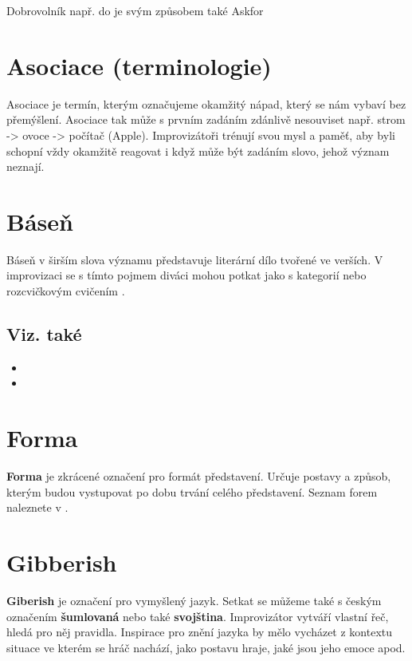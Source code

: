 \documentclass[main.tex]{subfiles}
\begin{document}
Dobrovolník např. do  je svým způsobem také Askfor 
 
 
\needspace{5cm} \section{Asociace (terminologie)} \label{asociace (terminologie)} Asociace je termín, kterým označujeme okamžitý nápad, který se nám vybaví bez přemýšlení. Asociace tak může s prvním zadáním zdánlivě nesouviset např. strom -> ovoce -> počítač (Apple). Improvizátoři trénují svou mysl a paměť, aby byli schopní vždy okamžitě reagovat i když může být zadáním slovo, jehož význam neznají. 
 
 
\needspace{5cm} \section{Báseň} \label{báseň} Báseň v širším slova významu představuje literární dílo tvořené ve verších. 
V improvizaci se s tímto pojmem diváci mohou potkat jako s kategorií  nebo rozcvičkovým cvičením . 
 
\subsection{Viz. také} \begin{itemize}
\item {}
\item {}
\end{itemize}
 
 
\needspace{5cm} \section{Forma} \label{forma} \textbf{Forma}{} je zkrácené označení pro formát představení. Určuje postavy a způsob, kterým budou vystupovat po dobu trvání celého představení. Seznam forem naleznete v . 
 
 
\needspace{5cm} \section{Gibberish} \label{gibberish} \textbf{Giberish}{} je označení pro vymyšlený jazyk. Setkat se můžeme také s českým označením \textbf{šumlovaná}{} nebo také \textbf{svojština}{}. Improvizátor vytváří vlastní řeč, hledá pro něj pravidla. Inspirace pro znění jazyka by mělo vycházet z kontextu situace ve kterém se hráč nachází, jako postavu hraje, jaké jsou jeho emoce apod. 
 
\end{document}
